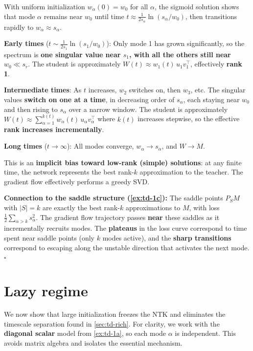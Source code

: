 \documentclass[11pt]{article}
\begin{document}
\begin{solution}[ex:td-3c]
With uniform initialization \(w_\alpha(0) = w_0\) for all
\(\alpha\), the sigmoid solution shows that mode \(\alpha\) remains near
\(w_0\) until time \(t \approx \frac{1}{2s_\alpha}\ln(s_\alpha/w_0)\),
then transitions rapidly to \(w_\alpha \approx s_\alpha\).

\textbf{Early times} (\(t \sim \frac{1}{2s_1}\ln(s_1/w_0)\)): Only mode
1 has grown significantly, so the spectrum is \textbf{one singular value
near \(s_1\), with all the others still near \(w_0 \ll s_r\)}. The
student is approximately \(W(t) \approx w_1(t)\,u_1 v_1^\top\),
effectively \textbf{rank 1}.

\textbf{Intermediate times}: As \(t\) increases, \(w_2\) switches on,
then \(w_3\), etc. The singular values \textbf{switch on one at a time},
in decreasing order of \(s_\alpha\), each staying near \(w_0\) and then
rising to \(s_\alpha\) over a narrow window. The student is
approximately
\(W(t) \approx \sum_{\alpha=1}^{k(t)} w_\alpha(t)\,u_\alpha v_\alpha^\top\)
where \(k(t)\) increases stepwise, so the effective \textbf{rank
increases incrementally}.

\textbf{Long times} (\(t \to \infty\)): All modes converge,
\(w_\alpha \to s_\alpha\), and \(W \to M\).

This is an \textbf{implicit bias toward low-rank (simple) solutions}: at
any finite time, the network represents the best rank-\(k\)
approximation to the teacher. The gradient flow effectively performs a
greedy SVD.

\textbf{Connection to the saddle structure (\cref{ex:td-1c}):} The saddle
points \(P_S M\) with \(|S| = k\) are exactly the best rank-\(k\)
approximations to \(M\), with loss
\(\frac{1}{2}\sum_{\alpha > k} s_\alpha^2\). The gradient flow
trajectory passes \textbf{near} these saddles as it incrementally
recruits modes. The \textbf{plateaus} in the loss curve correspond to
time spent near saddle points (only \(k\) modes active), and the
\textbf{sharp transitions} correspond to escaping along the unstable
direction that activates the next mode. \(\square\)
\end{solution}

\section{Lazy regime}
\label{sec:td-lazy}

We now show that large initialization freezes the NTK and eliminates the
timescale separation found in \cref{sec:td-rich}. For clarity, we work with the
\textbf{diagonal scalar} model from \cref{ex:td-1a}, so each mode
\(\alpha\) is independent. This avoids matrix algebra and isolates the
essential mechanism.
\end{document}
